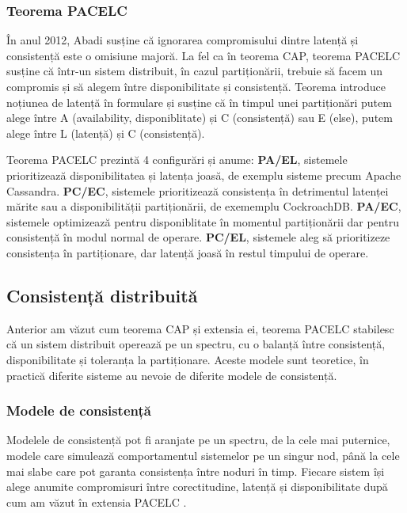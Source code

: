 \subsubsection{Teorema PACELC}
În anul 2012, Abadi \cite{abadi_consistency_2012} susține că ignorarea compromisului dintre latență și consistență este o omisiune majoră. La fel ca în teorema CAP, teorema PACELC susține că într-un sistem distribuit, în cazul partiționării, trebuie să facem un compromis și să alegem între disponibilitate și consistență. Teorema introduce noțiunea de latență în formulare și susține că în timpul unei partiționări putem alege între A (availability, disponiblitate) și C (consistență) sau E (else), putem alege între L (latență) și C (consistență).

Teorema PACELC prezintă 4 configurări și anume: \textbf{PA/EL}, sistemele prioritizează disponibilitatea și latența joasă, de exemplu sisteme precum Apache Cassandra. \textbf{PC/EC}, sistemele prioritizează consistența în detrimentul latenței mărite sau a disponibilității partiționării, de exememplu CockroachDB. \textbf{PA/EC}, sistemele optimizează pentru disponiblitate în momentul partiționării dar pentru consistență în modul normal de operare. \textbf{PC/EL}, sistemele aleg să prioritizeze consistența în partiționare, dar latență joasă în restul timpului de operare.

\subsection{Consistență distribuită}

Anterior am văzut cum teorema CAP și extensia ei, teorema PACELC stabilesc că un sistem distribuit operează pe un spectru, cu o balanță între consistență, disponibilitate și toleranța la partiționare. Aceste modele sunt teoretice, în practică diferite sisteme au nevoie de diferite modele de consistență.

\subsubsection{Modele de consistență}

Modelele de consistență pot fi aranjate pe un spectru, de la cele mai puternice, modele care simulează comportamentul sistemelor pe un singur nod, până la cele mai slabe care pot garanta consistența între noduri în timp. Fiecare sistem își alege anumite compromisuri între corectitudine, latență și disponibilitate după cum am văzut în extensia PACELC \cite{abadi_consistency_2012}.

